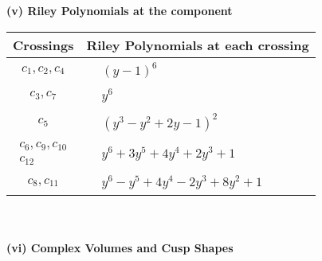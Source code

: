 \documentclass[1p]{elsarticle_modified}
\theoremstyle{definition}
\begin{document}
\newpage\renewcommand{\arraystretch}{1}
\flushleft \textbf{(v) Riley Polynomials at the component}\newline \\
\begin{tabular}{m{50pt}|m{274pt}}
Crossings & \hspace{64pt}Riley Polynomials at each crossing \\
\hline $$\begin{aligned}c_{1},c_{2},c_{4}\end{aligned}$$&$\begin{aligned}
&(y-1)^6
\end{aligned}$\\
\hline $$\begin{aligned}c_{3},c_{7}\end{aligned}$$&$\begin{aligned}
&y^6
\end{aligned}$\\
\hline $$\begin{aligned}c_{5}\end{aligned}$$&$\begin{aligned}
&(y^3- y^2+2 y-1)^2
\end{aligned}$\\
\hline $$\begin{aligned}c_{6},c_{9},c_{10}\\c_{12}\end{aligned}$$&$\begin{aligned}
&y^6+3 y^5+4 y^4+2 y^3+1
\end{aligned}$\\
\hline $$\begin{aligned}c_{8},c_{11}\end{aligned}$$&$\begin{aligned}
&y^6- y^5+4 y^4-2 y^3+8 y^2+1
\end{aligned}$\\
\hline
\end{tabular}\\~\\
\newpage\flushleft \textbf{(vi) Complex Volumes and Cusp Shapes}
\end{document}
